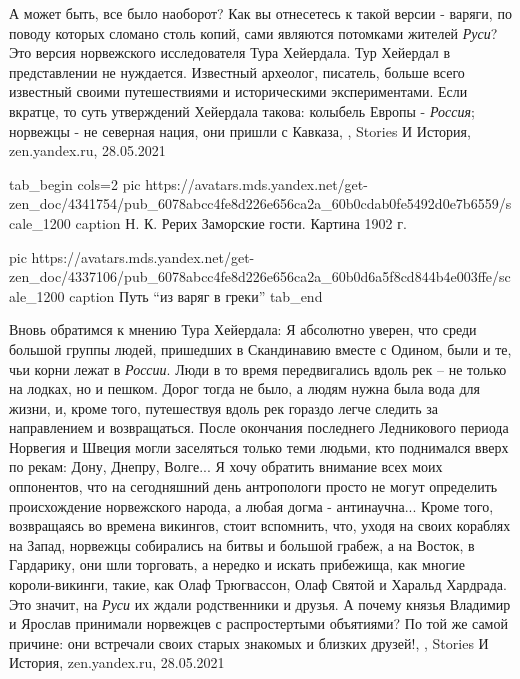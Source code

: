 А может быть, все было наоборот? Как вы отнесетесь к такой версии - варяги, по
поводу которых сломано столь копий, сами являются потомками жителей
\emph{Руси}? Это версия норвежского исследователя Тура Хейердала.  Тур Хейердал
в представлении не нуждается. Известный археолог, писатель, больше всего
известный своими путешествиями и историческими экспериментами. Если вкратце, то
суть утверждений Хейердала такова: колыбель Европы - \emph{Россия}; норвежцы -
не северная нация, они пришли с Кавказа,
, 
Stories И История, zen.yandex.ru, 28.05.2021

\ifcmt
tab_begin cols=2
  pic https://avatars.mds.yandex.net/get-zen_doc/4341754/pub_6078abcc4fe8d226e656ca2a_60b0cdab0fe5492d0e7b6559/scale_1200
  caption Н. К. Рерих Заморские гости. Картина 1902 г.

  pic https://avatars.mds.yandex.net/get-zen_doc/4337106/pub_6078abcc4fe8d226e656ca2a_60b0d6a5f8cd844b4e003ffe/scale_1200
  caption Путь \enquote{из варяг в греки}
tab_end
\fi

Вновь обратимся к мнению Тура Хейердала: Я абсолютно уверен, что среди большой
группы людей, пришедших в Скандинавию вместе с Одином, были и те, чьи корни
лежат в \emph{России}. Люди в то время передвигались вдоль рек – не только на
лодках, но и пешком. Дорог тогда не было, а людям нужна была вода для жизни, и,
кроме того, путешествуя вдоль рек гораздо легче следить за направлением и
возвращаться. После окончания последнего Ледникового периода Норвегия и Швеция
могли заселяться только теми людьми, кто поднимался вверх по рекам: Дону,
Днепру, Волге... Я хочу обратить внимание всех моих оппонентов, что на
сегодняшний день антропологи просто не могут определить происхождение
норвежского народа, а любая догма - антинаучна... Кроме того, возвращаясь во
времена викингов, стоит вспомнить, что, уходя на своих кораблях на Запад,
норвежцы собирались на битвы и большой грабеж, а на Восток, в Гардарику, они
шли торговать, а нередко и искать прибежища, как многие короли-викинги, такие,
как Олаф Трюгвассон, Олаф Святой и Харальд Хардрада. Это значит, на \emph{Руси}
их ждали родственники и друзья. А почему князья Владимир и Ярослав принимали
норвежцев с распростертыми объятиями? По той же самой причине: они встречали
своих старых знакомых и близких друзей!,
, Stories И История, zen.yandex.ru, 28.05.2021

